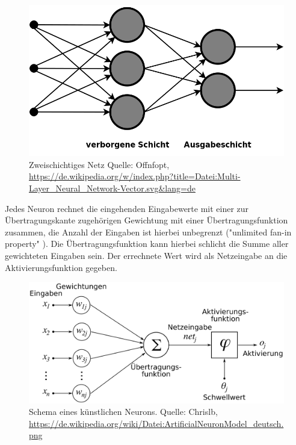 \documentclass[
	12pt,
	a4paper,
	BCOR10mm,
	DIV14,
	listof=totoc,
	bibliography=totoc,
	headsepline
]{scrreprt}
\begin{document}
\begin{figure}[h]
	\begin{center}
		\includegraphics[totalheight=0.2\textheight]{Bilder/Multi-Layer_Neural_Network-Vector.png}
	\end{center}
	\caption{Zweischichtiges Netz Quelle: Offnfopt, \url{https://de.wikipedia.org/w/index.php?title=Datei:Multi-Layer_Neural_Network-Vector.svg&lang=de}}
	\label{fig:Schichten}
\end{figure}
Jedes Neuron rechnet die eingehenden Eingabewerte mit einer zur Übertragungskante zugehörigen Gewichtung mit einer Übertragungsfunktion zusammen, die Anzahl der Eingaben ist hierbei unbegrenzt ("unlimited fan-in property" \cite{Rojas:1996:NNS:235222}). Die Übertragungsfunktion kann hierbei schlicht die Summe aller gewichteten Eingaben sein. Der errechnete Wert wird als Netzeingabe an die Aktivierungsfunktion gegeben. 
\begin{figure}[h]
	\begin{center}
		\includegraphics[totalheight=0.2\textheight]{Bilder/ArtificialNeuronModel_deutsch.png}
	\end{center}
	\caption{Schema eines künstlichen Neurons. Quelle: Chrislb, \url{https://de.wikipedia.org/wiki/Datei:ArtificialNeuronModel_deutsch.png}} %
	\label{fig:Neuron}
\end{figure}
\end{document}
